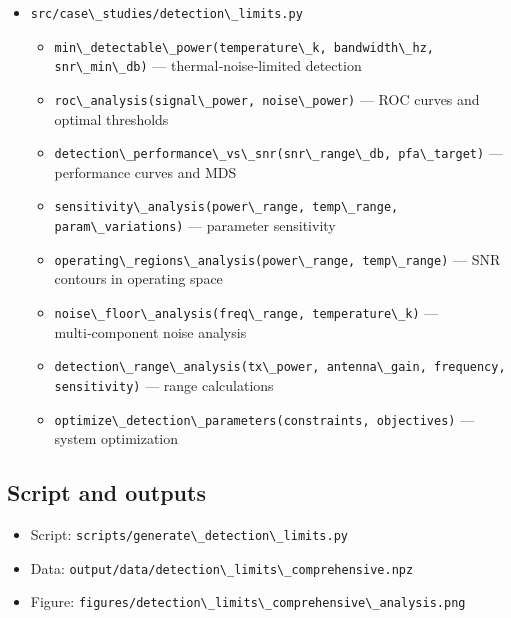 \documentclass[
  13pt,
  a4paperpaper,
  12pt]{article}
\newcommand{\passthrough}[1]{#1}
\providecommand{\tightlist}{%
  \setlength{\itemsep}{0pt}\setlength{\parskip}{0pt}}
\begin{document}
\begin{itemize}
\tightlist
\item
  \passthrough{\lstinline!src/case\_studies/detection\_limits.py!}

  \begin{itemize}
  \tightlist
  \item
    \passthrough{\lstinline!min\_detectable\_power(temperature\_k, bandwidth\_hz, snr\_min\_db)!}
    --- thermal‑noise‑limited detection
  \item
    \passthrough{\lstinline!roc\_analysis(signal\_power, noise\_power)!}
    --- ROC curves and optimal thresholds
  \item
    \passthrough{\lstinline!detection\_performance\_vs\_snr(snr\_range\_db, pfa\_target)!}
    --- performance curves and MDS
  \item
    \passthrough{\lstinline!sensitivity\_analysis(power\_range, temp\_range, param\_variations)!}
    --- parameter sensitivity
  \item
    \passthrough{\lstinline!operating\_regions\_analysis(power\_range, temp\_range)!}
    --- SNR contours in operating space
  \item
    \passthrough{\lstinline!noise\_floor\_analysis(freq\_range, temperature\_k)!}
    --- multi‑component noise analysis
  \item
    \passthrough{\lstinline!detection\_range\_analysis(tx\_power, antenna\_gain, frequency, sensitivity)!}
    --- range calculations
  \item
    \passthrough{\lstinline!optimize\_detection\_parameters(constraints, objectives)!}
    --- system optimization
  \end{itemize}
\end{itemize}

\subsection{Script and outputs}\label{script-and-outputs-2}

\begin{itemize}
\tightlist
\item
  Script:
  \passthrough{\lstinline!scripts/generate\_detection\_limits.py!}
\item
  Data:
  \passthrough{\lstinline!output/data/detection\_limits\_comprehensive.npz!}
\item
  Figure:
  \passthrough{\lstinline!figures/detection\_limits\_comprehensive\_analysis.png!}
\end{itemize}
\end{document}
